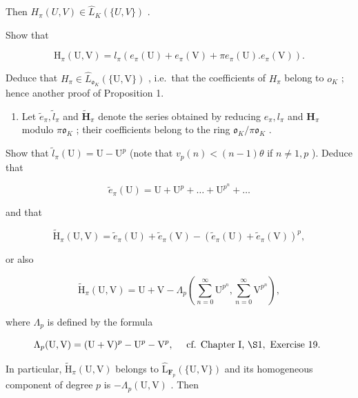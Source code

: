 Then \(H_{\pi}(U, V) \in \hat{L}_{K}(\{U, V\})\) .

Show that

\[
\mathrm{H} _ {\pi} (\mathrm{U}, \mathrm{V}) = l _ {\pi} (e _ {\pi} (\mathrm{U}) + e _ {\pi} (\mathrm{V}) + \pi e _ {\pi} (\mathrm{U}). e _ {\pi} (\mathrm{V})).
\]

Deduce that \(H_{\pi} \in \hat{L}_{\mathfrak{o}_{K}}(\{\mathrm{U}, \mathrm{V}\})\) , i.e.~that the coefficients of \(H_{\pi}\) belong to \(o_{K}\) ; hence another proof of Proposition 1.

\begin{enumerate}
\def\labelenumi{(\alph{enumi})}
\setcounter{enumi}{3}
\tightlist
\item
  Let \(\tilde{e}_{\pi}, \tilde{l}_{\pi}\) and \(\tilde{\mathbf{H}}_{\pi}\) denote the series obtained by reducing \(e_{\pi}, l_{\pi}\) and \(\mathbf{H}_{\pi}\) modulo \(\pi \mathfrak{o}_{K}\) ; their coefficients belong to the ring \(\mathfrak{o}_{K} / \pi \mathfrak{o}_{K}\) .
\end{enumerate}

Show that \(\tilde{l}_{\pi}(\mathrm{U}) = \mathrm{U} - \mathrm{U}^{p}\) (note that \(v_{p}(n) < (n - 1)\theta\) if \(n \neq 1, p\) ). Deduce that

\[
\tilde {e} _ {\pi} (\mathrm{U}) = \mathrm{U} + \mathrm{U} ^ {p} + \dots + \mathrm{U} ^ {p ^ {n}} + \dots
\]

and that

\[
\tilde {\mathrm{H}} _ {\pi} (\mathrm{U}, \mathrm{V}) = \tilde {e} _ {\pi} (\mathrm{U}) + \tilde {e} _ {\pi} (\mathrm{V}) - (\tilde {e} _ {\pi} (\mathrm{U}) + \tilde {e} _ {\pi} (\mathrm{V})) ^ {p},
\]

or also

\[
\tilde {\mathrm{H}} _ {\pi} (\mathrm{U}, \mathrm{V}) = \mathrm{U} + \mathrm{V} - \Lambda_ {p} \left(\sum_ {n = 0} ^ {\infty} \mathrm{U} ^ {p ^ {n}}, \sum_ {n = 0} ^ {\infty} \mathrm{V} ^ {p ^ {n}}\right),
\]

where \(\Lambda_{p}\) is defined by the formula

\[
\Lambda_ {p} (\mathrm{U}, \mathrm{V}) = (\mathrm{U} + \mathrm{V}) ^ {p} - \mathrm{U} ^ {p} - \mathrm{V} ^ {p}, \quad \text { cf.   Chapter   I,   } \S 1, \text {   Exercise   19. }
\]

In particular, \(\tilde{\mathrm{H}}_{\pi}(\mathrm{U},\mathrm{V})\) belongs to \(\hat{\mathrm{L}}_{\mathbf{F}_{p}}(\{\mathrm{U},\mathrm{V}\})\) and its homogeneous component of degree \(p\) is \(-\Lambda_p(\mathrm{U},\mathrm{V})\) . Then

